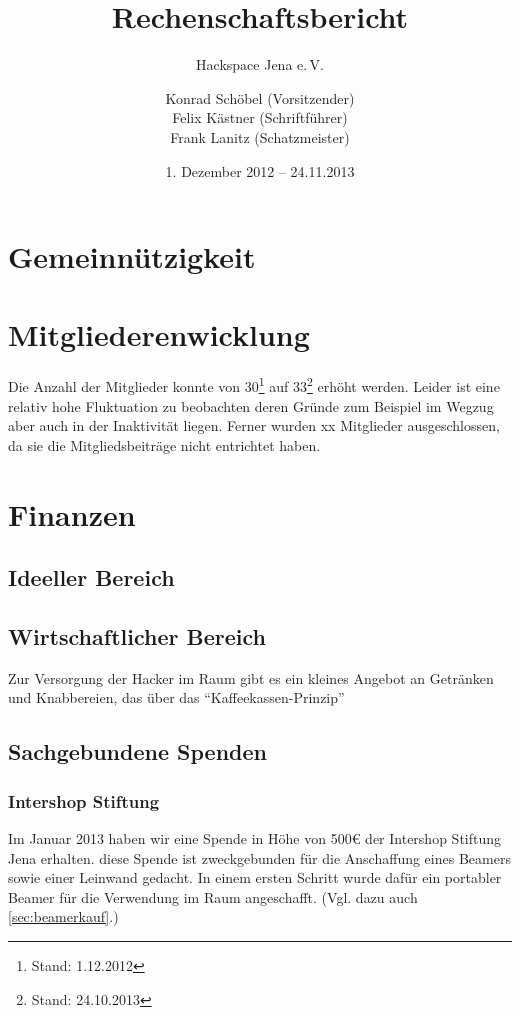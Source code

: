 \documentclass[10pt,DIV16]{scrartcl}
\title{Rechenschaftsbericht}
\subtitle{Hackspace Jena e.\,V.}
\author{%
	Konrad Schöbel (Vorsitzender)\\
    Felix Kästner (Schriftführer)\\
	Frank Lanitz (Schatzmeister)
}
\date{1. Dezember 2012 -- 24.11.2013}
\begin{document}
\maketitle{}

\tableofcontents{}

\newpage{}

\section{Gemeinnützigkeit}

\section{Mitgliederenwicklung}

Die Anzahl der Mitglieder konnte von 30\footnote{Stand: 1.12.2012} auf
33\footnote{Stand: 24.10.2013} erhöht werden. Leider ist eine relativ
hohe Fluktuation zu beobachten deren Gründe zum Beispiel im Wegzug aber
auch in der Inaktivität liegen. Ferner wurden xx Mitglieder
ausgeschlossen, da sie die Mitgliedsbeiträge nicht entrichtet haben.

\section{Finanzen}

\subsection{Ideeller Bereich}

\subsection{Wirtschaftlicher Bereich}

Zur Versorgung der Hacker im Raum gibt es ein kleines Angebot an
Getränken und Knabbereien, das über das "`Kaffeekassen-Prinzip"'


\subsection{Sachgebundene Spenden}
\subsubsection{Intershop Stiftung}
\label{sec:iss-spende}
Im Januar 2013 haben wir eine Spende in Höhe von 500\euro{} der Intershop
Stiftung Jena erhalten. diese Spende ist zweckgebunden für die
Anschaffung eines Beamers sowie einer Leinwand gedacht. In einem
ersten Schritt wurde dafür ein portabler Beamer für die Verwendung
im Raum angeschafft. (Vgl. dazu auch \ref{sec:beamerkauf}.)
\end{document}
